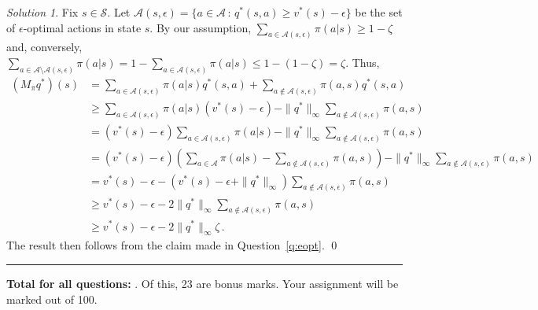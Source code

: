 \documentclass{article}
\newcommand{\norm}[1]{\| #1 \|}
\DeclareMathOperator*{\1}{\mathbbm{1}}
\newcounter{DocPoints} %
\theoremstyle{definition}
\theoremstyle{remark}
\newtheorem*{solution*}{Solution}
\newcommand{\cS}{\mathcal{S}}
\newcommand{\cA}{\mathcal{A}}
\begin{document}
\begin{solution*}
Fix $s\in \cS$.
Let $\cA(s,\epsilon) = \{ a\in \cA \,:\, q^*(s,a)\ge v^*(s) - \epsilon \}$ be the set of $\epsilon$-optimal actions in state $s$.
By our assumption, $\sum_{a\in \cA(s,\epsilon)} \pi(a|s) \ge 1-\zeta$ and, conversely, 
$\sum_{a\in \cA \setminus \cA(s,\epsilon)} \pi(a|s)
=1- \sum_{a\in \cA(s,\epsilon)} \pi(a|s)
\le 1-(1-\zeta)=\zeta$.
Thus,
\begin{align*}
(M_\pi q^*)(s) 
& = \sum_{a\in \cA(s,\epsilon)} \pi(a|s) q^*(s,a) + \sum_{a\not\in \cA(s,\epsilon)} \pi(a,s) q^*(s,a)\\
& \ge \sum_{a\in \cA(s,\epsilon)} \pi(a|s) (v^*(s)-\epsilon) - \norm{q^*}_\infty \sum_{a\not\in \cA(s,\epsilon)} \pi(a,s)\\
& = (v^*(s)-\epsilon) \sum_{a\in \cA(s,\epsilon)} \pi(a|s)  - \norm{q^*}_\infty \sum_{a\not\in \cA(s,\epsilon)} \pi(a,s)\\
& = (v^*(s)-\epsilon)\left( \sum_{a\in \cA} \pi(a|s) 
	-  \sum_{a\not\in \cA(s,\epsilon)} \pi(a,s)\right)
	 - \norm{q^*}_\infty \sum_{a\not\in \cA(s,\epsilon)} \pi(a,s)\\
& = v^*(s)-\epsilon
	-  (v^*(s)-\epsilon+\norm{q^*}_\infty) \sum_{a\not\in \cA(s,\epsilon)} \pi(a,s)\\
& \ge v^*(s)-\epsilon
	-  2\norm{q^*}_\infty \sum_{a\not\in \cA(s,\epsilon)} \pi(a,s)\\
& \ge v^*(s)-\epsilon
	-  2\norm{q^*}_\infty \zeta\,.
\end{align*}
The result then follows from the claim made in Question~\ref{q:eopt}.
\qed\par\smallskip\hrule
\end{solution*}


\bigskip
\bigskip

\noindent
\textbf{
Total for all questions: }.
Of this, 23 are bonus marks. 
Your assignment will be marked out of 100.
\end{document}
